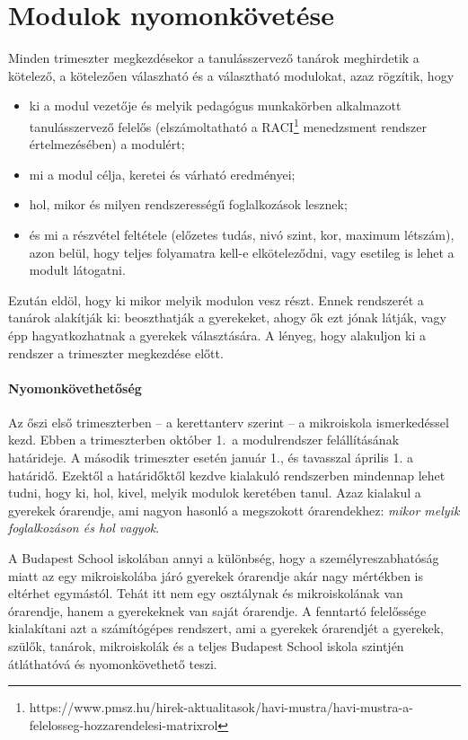 \section{Modulok nyomonkövetése}
Minden trimeszter megkezdésekor a tanulásszervező tanárok meghirdetik a kötelező, a kötelezően válaszható és a választható modulokat, azaz rögzítik, hogy
\begin{itemize}
    \item ki a modul vezetője és melyik pedagógus munkakörben alkalmazott tanulásszervező felelős (elszámoltatható a RACI\footnote{https://www.pmsz.hu/hirek-aktualitasok/havi-mustra/havi-mustra-a-felelosseg-hozzarendelesi-matrixrol} menedzsment rendszer értelmezésében) a modulért;
    \item mi a modul célja, keretei és várható eredményei;
    \item hol, mikor és milyen rendszerességű foglalkozások lesznek;
    \item és mi a részvétel feltétele (előzetes tudás, nivó szint, kor, maximum létszám), azon belül, hogy teljes folyamatra kell-e elköteleződni, vagy esetileg is lehet a modult látogatni.
\end{itemize}
Ezután eldöl, hogy ki mikor  melyik modulon vesz részt. Ennek rendszerét a tanárok alakítják ki: beoszthatják a gyerekeket, ahogy ők ezt jónak látják, vagy épp hagyatkozhatnak a gyerekek választására. A lényeg, hogy alakuljon ki a rendszer a trimeszter megkezdése előtt.

\paragraph{Nyomonkövethetőség}
Az őszi első trimeszterben  -- a kerettanterv szerint -- a mikroiskola ismerkedéssel kezd. Ebben a trimeszterben október 1.~a modulrendszer felállításának határideje. A második trimeszter esetén január 1., és tavasszal április 1. a határidő. Ezektől a határidőktől kezdve kialakuló rendszerben mindennap lehet tudni, hogy ki, hol, kivel, melyik modulok keretében tanul. Azaz kialakul a gyerekek órarendje, ami nagyon hasonló a megszokott órarendekhez: \emph{mikor melyik foglalkozáson és hol vagyok}.

A Budapest School iskolában annyi a különbség, hogy a személyreszabhatóság miatt az egy mikroiskolába járó gyerekek órarendje akár nagy mértékben is eltérhet egymástól. Tehát itt nem egy osztálynak és mikroiskolának van órarendje, hanem a gyerekeknek van saját órarendje. A fenntartó felelőssége kialakítani azt a számítógépes rendszert, ami a gyerekek órarendjét a gyerekek, szülők, tanárok, mikroiskolák és a teljes Budapest School iskola szintjén átláthatóvá és nyomonkövethető teszi.

